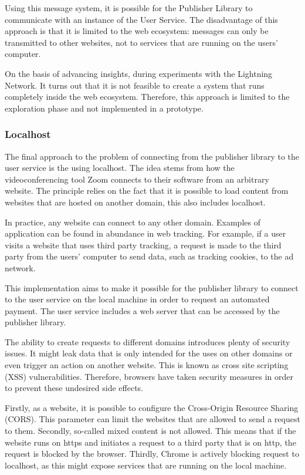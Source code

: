 Using this message system, it is possible for the Publisher Library to communicate with an instance of the User Service. The disadvantage of this approach is that it is limited to the web ecosystem: messages can only be transmitted to other websites, not to services that are running on the users' computer. 

On the basis of advancing insights, during experiments with the Lightning Network. It turns out that it is not feasible to create a system that runs completely inside the web ecosystem. Therefore, this approach is limited to the exploration phase and not implemented in a prototype.

\subsubsection{Localhost}

The final approach to the problem of connecting from the publisher library to the user service is the using localhost. The idea stems from how the videoconferencing tool Zoom connects to their software from an arbitrary website. The principle relies on the fact that it is possible to load content from websites that are hosted on another domain, this also includes localhost.

In practice, any website can connect to any other domain. Examples of application can be found in abundance in web tracking. For example, if a user visits a website that uses third party tracking, a request is made to the third party from the users' computer to send data, such as tracking cookies, to the ad network. 

This implementation aims to make it possible for the publisher library to connect to the user service on the local machine in order to request an automated payment. The user service includes a web server that can be accessed by the publisher library. 

The ability to create requests to different domains introduces plenty of security issues. It might leak data that is only intended for the uses on other domains or even trigger an action on another website. This is known as cross site scripting (XSS) vulnerabilities. Therefore, browsers have taken security measures in order to prevent these undesired side effects.

Firstly, as a website, it is possible to configure the Cross-Origin Resource Sharing (CORS). This parameter can limit the websites that are allowed to send a request to them. Secondly, so-called mixed content is not allowed. This means that if the website runs on https and initiates a request to a third party that is on http, the request is blocked by the browser. Thirdly, Chrome is actively blocking request to localhost, as this might expose services that are running on the local machine.


